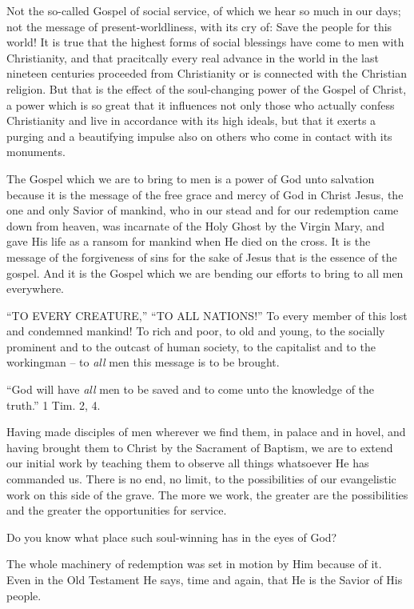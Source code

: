 \documentclass[
]{book}
\begin{document}
Not the so-called Gospel of social service, of which we hear so much in our days; not the message of present-worldliness, with its cry of: Save the people for this world! It is true that the highest forms of social blessings have come to men with Christianity, and that pracitcally every real advance in the world in the last nineteen centuries proceeded from Christianity or is connected with the Christian religion. But that is the effect of the soul-changing power of the Gospel of Christ, a power which is so great that it influences not only those who actually confess Christianity and live in accordance with its high ideals, but that it exerts a purging and a beautifying impulse also on others who come in contact with its monuments.

The Gospel which we are to bring to men is a power of God unto salvation because it is the message of the free grace and mercy of God in Christ Jesus, the one and only Savior of mankind, who in our stead and for our redemption came down from heaven, was incarnate of the Holy Ghost by the Virgin Mary, and gave His life as a ransom for mankind when He died on the cross. It is the message of the forgiveness of sins for the sake of Jesus that is the essence of the gospel. And it is the Gospel which we are bending our efforts to bring to all men everywhere.

``TO EVERY CREATURE,'' ``TO ALL NATIONS!'' To every member of this lost and condemned mankind! To rich and poor, to old and young, to the socially prominent and to the outcast of human society, to the capitalist and to the workingman -- to \emph{all} men this message is to be brought.

``God will have \emph{all} men to be saved and to come unto the knowledge of the truth.'' 1 Tim. 2, 4.

Having made disciples of men wherever we find them, in palace and in hovel, and having brought them to Christ by the Sacrament of Baptism, we are to extend our initial work by teaching them to observe all things whatsoever He has commanded us. There is no end, no limit, to the possibilities of our evangelistic work on this side of the grave. The more we work, the greater are the possibilities and the greater the opportunities for service.

Do you know what place such soul-winning has in the eyes of God?

The whole machinery of redemption was set in motion by Him because of it. Even in the Old Testament He says, time and again, that He is the Savior of His people.
\end{document}
